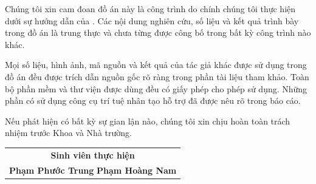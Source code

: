 \begin{declaration}

Chúng tôi xin cam đoan đồ án này là công trình do chính chúng tôi thực hiện dưới sự
hướng dẫn của \dauGVHD. Các nội dung nghiên cứu, số liệu và kết quả trình
bày trong đồ án là trung thực và chưa từng được công bố trong bất kỳ công
trình nào khác.

Mọi số liệu, hình ảnh, mã nguồn và kết quả của tác giả khác được sử dụng
trong đồ án đều được trích dẫn nguồn gốc rõ ràng trong phần tài liệu tham
khảo. Toàn bộ phần mềm và thư viện được dùng đều có giấy phép cho phép sử
dụng. Những phần có sử dụng công cụ trí tuệ nhân tạo hỗ trợ đã được nêu rõ
trong báo cáo.

Nếu phát hiện có bất kỳ sự gian lận nào, chúng tôi xin chịu hoàn toàn trách nhiệm
trước Khoa và Nhà trường.

\vspace{1.4em}
\hfill
\begin{tabular}{c}
\textbf{Sinh viên thực hiện} \\[3.5em]
\textbf{Phạm Phước Trung} \quad \textbf{Phạm Hoàng Nam}
\end{tabular}

\end{declaration}